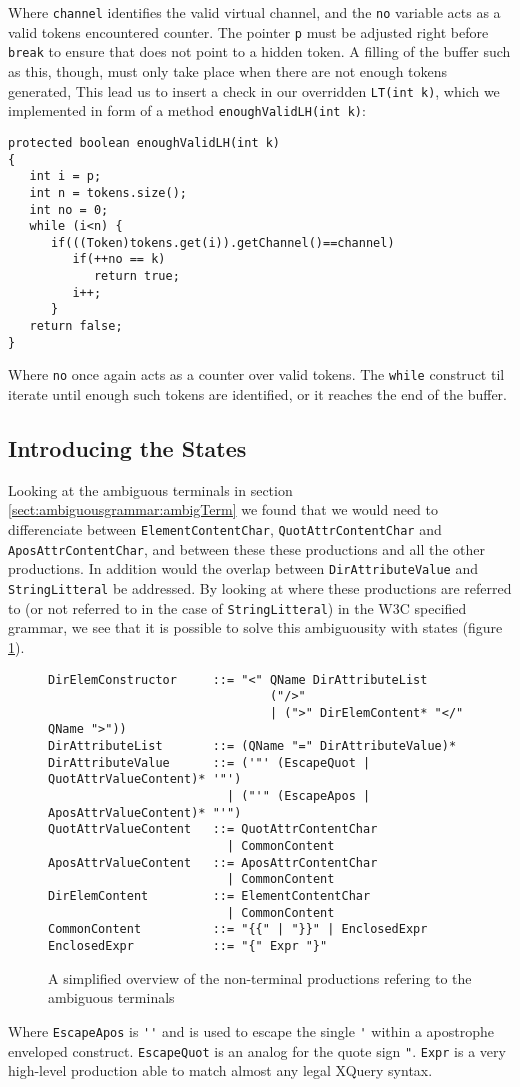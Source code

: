Where \verb!channel! identifies the valid virtual channel, and the \verb!no! variable acts as a valid tokens encountered counter. The pointer \verb!p! must be adjusted right before \verb!break! to ensure that does not point to a hidden token. A filling of the buffer such as this, though, must only take place when there are not enough tokens generated, This lead us to insert a check in our overridden \verb!LT(int k)!, which we implemented in form of a method \verb!enoughValidLH(int k)!:
\begin{verbatim}
protected boolean enoughValidLH(int k)
{
   int i = p;
   int n = tokens.size();
   int no = 0;
   while (i<n) {
      if(((Token)tokens.get(i)).getChannel()==channel)
         if(++no == k)
            return true;
         i++;
      }
   return false;
}
\end{verbatim}
Where \verb!no! once again acts as a counter over valid tokens. The \verb!while! construct til iterate until enough such tokens are identified, or it reaches the end of the buffer.

\subsection{Introducing the States}
\label{sect:rewriteGrammar:introduceStates}
Looking at the ambiguous terminals in section \ref{sect:ambiguousgrammar:ambigTerm} we found that we would need to differenciate between \verb!ElementContentChar!, \verb!QuotAttrContentChar! and \verb!AposAttrContentChar!, and between these these productions and all the other productions. In addition would the overlap between \verb!DirAttributeValue! and \verb!StringLitteral! be addressed. By looking at where these productions are referred to (or not referred to in the case of \verb!StringLitteral!) in the W3C specified grammar, we see that it is possible to solve this ambiguousity with states (figure \ref{fig:ambigTerminalRef}).
\begin{figure}
\begin{verbatim}
DirElemConstructor     ::= "<" QName DirAttributeList 
                               ("/>" 
                               | (">" DirElemContent* "</" QName ">"))
DirAttributeList       ::= (QName "=" DirAttributeValue)*
DirAttributeValue      ::= ('"' (EscapeQuot | QuotAttrValueContent)* '"')
                         | ("'" (EscapeApos | AposAttrValueContent)* "'")
QuotAttrValueContent   ::= QuotAttrContentChar
                         | CommonContent
AposAttrValueContent   ::= AposAttrContentChar
                         | CommonContent
DirElemContent         ::= ElementContentChar
                         | CommonContent
CommonContent          ::= "{{" | "}}" | EnclosedExpr
EnclosedExpr           ::= "{" Expr "}"
\end{verbatim}
\caption[Grammar reffering to amiguous terminals.]{A simplified overview of the non-terminal productions refering to the ambiguous terminals}
\label{fig:ambigTerminalRef}
\end{figure}
Where \verb!EscapeApos! is \verb!''! and is used to escape the single \verb!'! within a apostrophe enveloped construct. \verb!EscapeQuot! is an analog for the quote sign \verb!"!. \verb!Expr! is a very high-level production able to match almost any legal XQuery syntax.

